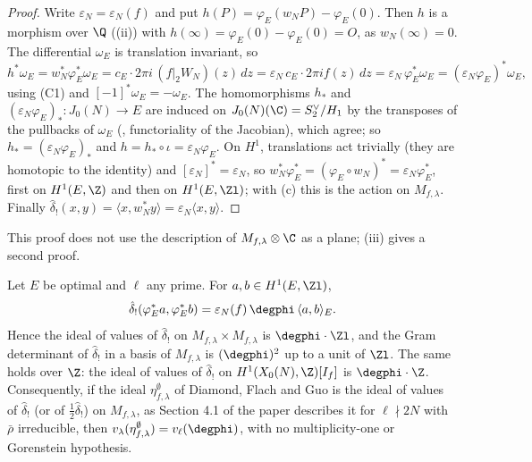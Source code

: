 \begin{proof}
Write $\varepsilon_N=\varepsilon_N(f)$ and put $h(P)=\varphi_E(w_NP)-\varphi_E(0)$. Then $h$ is a morphism over $\Q$ ((ii)) with $h(\infty)=\varphi_E(0)-\varphi_E(0)=O$, as
$w_N(\infty)=0$. The differential $\omega_E$ is translation invariant, so
\[
h^*\omega_E=w_N^*\varphi_E^*\omega_E=c_E\cdot2\pi i\,(f|_2W_N)(z)\,dz=\varepsilon_N\,c_E\cdot2\pi if(z)\,dz=\varepsilon_N\,\varphi_E^*\omega_E=(\varepsilon_N\varphi_E)^*\omega_E,
\]
using (C1) and $[-1]^*\omega_E=-\omega_E$. The homomorphisms $h_*$ and $(\varepsilon_N\varphi_E)_*\colon J_0(N)\to E$ are induced on $J_0(N)(\C)=S_2^\vee/H_1$ by the transposes of the
pullbacks of $\omega_E$ (, functoriality of the Jacobian), which agree; so $h_*=(\varepsilon_N\varphi_E)_*$ and $h=h_*\circ\iota=\varepsilon_N\varphi_E$. On $H^1$, translations act trivially
(they are homotopic to the identity) and $[\varepsilon_N]^*=\varepsilon_N$, so $w_N^*\varphi_E^*=(\varphi_E\circ w_N)^*=\varepsilon_N\varphi_E^*$, first on $H^1(E,\Z)$ and then on $H^1(E,\Zl)$; with
(c) this is the action on $M_{f,\lambda}$. Finally $\hat\delta_!(x,y)=\langle x,w_N^*y\rangle=\varepsilon_N\langle x,y\rangle$.
\end{proof}

This proof does not use the description of $M_{f,\lambda}\otimes\C$ as a plane; (iii) gives a second proof.

\begin{theorem}\label{thm:moddeg:degree-is-eta}
Let $E$ be optimal and $\ell$ any prime. For $a,b\in H^1(E,\Zl)$,
\[
\hat\delta_!(\varphi_E^*a,\varphi_E^*b)=\varepsilon_N(f)\,\degphi\,\langle a,b\rangle_E .
\]
Hence the ideal of values of $\hat\delta_!$ on $M_{f,\lambda}\times M_{f,\lambda}$ is $\degphi\cdot\Zl$, and the Gram determinant of $\hat\delta_!$ in a basis of $M_{f,\lambda}$ is $(\degphi)^2$ up to a unit of $\Zl$.
The same holds over $\Z$: the ideal of values of $\hat\delta_!$ on $H^1(X_0(N),\Z)[I_f]$ is $\degphi\cdot\Z$. Consequently, if the ideal $\eta^\emptyset_{f,\lambda}$ of Diamond, Flach and Guo is the
ideal of values of $\hat\delta_!$ (or of $\frac12\hat\delta_!$) on $M_{f,\lambda}$, as Section 4.1 of the paper describes it for $\ell\nmid2N$ with $\bar\rho$ irreducible, then
$v_\lambda(\eta^\emptyset_{f,\lambda})=v_\ell(\degphi)$, with no multiplicity-one or Gorenstein hypothesis.
\end{theorem}

